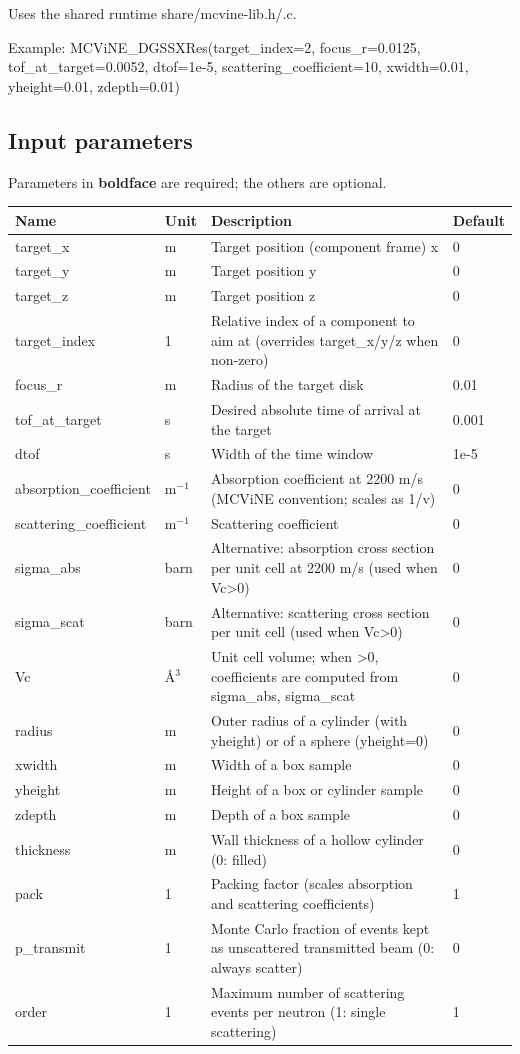 Uses the shared runtime share/mcvine-lib.h/.c.

Example: MCViNE\_DGSSXRes(target\_index=2, focus\_r=0.0125, tof\_at\_target=0.0052, dtof=1e-5, scattering\_coefficient=10, xwidth=0.01, yheight=0.01, zdepth=0.01)

\subsection*{Input parameters}
Parameters in \textbf{boldface} are required; the others are optional.

\begin{longtable}{p{}p{}p{}p{}}
\toprule
\textbf{Name} & \textbf{Unit} & \textbf{Description} & \textbf{Default} \\
\midrule
\endhead
target\_x & m & Target position (component frame) x & 0 \\
target\_y & m & Target position y & 0 \\
target\_z & m & Target position z & 0 \\
target\_index & 1 & Relative index of a component to aim at (overrides target\_x/y/z when non-zero) & 0 \\
focus\_r & m & Radius of the target disk & 0.01 \\
tof\_at\_target & s & Desired absolute time of arrival at the target & 0.001 \\
dtof & s & Width of the time window & 1e-5 \\
absorption\_coefficient & m$^{-1}$ & Absorption coefficient at 2200 m/s (MCViNE convention; scales as 1/v) & 0 \\
scattering\_coefficient & m$^{-1}$ & Scattering coefficient & 0 \\
sigma\_abs & barn & Alternative: absorption cross section per unit cell at 2200 m/s (used when Vc\textgreater{}0) & 0 \\
sigma\_scat & barn & Alternative: scattering cross section per unit cell (used when Vc\textgreater{}0) & 0 \\
Vc & \AA{}$^{3}$ & Unit cell volume; when \textgreater{}0, coefficients are computed from sigma\_abs, sigma\_scat & 0 \\
radius & m & Outer radius of a cylinder (with yheight) or of a sphere (yheight=0) & 0 \\
xwidth & m & Width of a box sample & 0 \\
yheight & m & Height of a box or cylinder sample & 0 \\
zdepth & m & Depth of a box sample & 0 \\
thickness & m & Wall thickness of a hollow cylinder (0: filled) & 0 \\
pack & 1 & Packing factor (scales absorption and scattering coefficients) & 1 \\
p\_transmit & 1 & Monte Carlo fraction of events kept as unscattered transmitted beam (0: always scatter) & 0 \\
order & 1 & Maximum number of scattering events per neutron (1: single scattering) & 1 \\
\bottomrule
\end{longtable}

